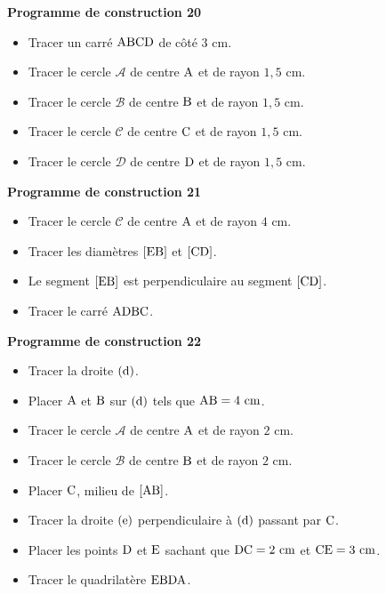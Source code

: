 \documentclass{article}
\begin{document}
\noindent\textbf{Programme de construction 20}\par\smallskip\noindent
\begin{itemize}
    \item Tracer un carré $\text{ABCD}$ de côté $3\text{ cm}$.
    \item Tracer le cercle $\mathcal{A}$ de centre $\text{A}$ et de
    rayon $1{,}5\text{ cm}$.
    \item Tracer le cercle $\mathcal{B}$ de centre $\text{B}$ et de
    rayon $1{,}5\text{ cm}$.
    \item Tracer le cercle $\mathcal{C}$ de centre $\text{C}$ et de
    rayon $1{,}5\text{ cm}$.
    \item Tracer le cercle $\mathcal{D}$ de centre $\text{D}$ et de
    rayon $1{,}5\text{ cm}$.
\end{itemize}
\noindent\textbf{Programme de construction 21}\par\smallskip\noindent
\begin{itemize}
    \item Tracer le cercle $\mathcal{C}$ de centre $\text{A}$ et de
    rayon $4\text{ cm}$.
    \item Tracer les diamètres $[\text{EB}]$ et $[\text{CD}]$.
    \item Le segment $[\text{EB}]$ est perpendiculaire au segment
    $[\text{CD}]$.
    \item Tracer le carré $\text{ADBC}$.
\end{itemize}
\noindent\textbf{Programme de construction 22}\par\smallskip\noindent
\begin{itemize}
    \item Tracer la droite $(\text{d})$.
    \item Placer $\text{A}$ et $\text{B}$ sur
    $(\text{d})$ tels que $\text{AB}=4\text{ cm}$.
    \item Tracer le cercle $\mathcal{A}$ de centre $\text{A}$ et de
    rayon $2\text{ cm}$.
    \item Tracer le cercle $\mathcal{B}$ de centre $\text{B}$ et de
    rayon $2\text{ cm}$.
    \item Placer $\text{C}$, milieu de $[\text{AB}]$.
    \item Tracer la droite $(\text{e})$ perpendiculaire à
    $(\text{d})$ passant par $\text{C}$.
    \item Placer les points $\text{D}$ et $\text{E}$ sachant
    que $\text{DC}=2\text{ cm}$ et $\text{CE}=3\text{ cm}$.
    \item Tracer le quadrilatère $\text{EBDA}$.
\end{itemize}
\end{document}
